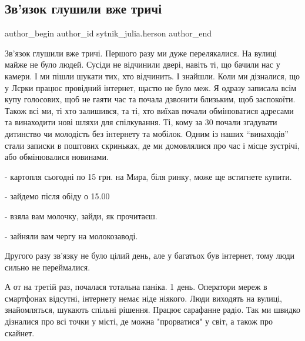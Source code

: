  
 
 
 
 
 
\subsection{Зв'язок глушили вже тричі}
\label{sec:04_05_2022.fb.sytnik_julia.herson.1.zvjazok_glyshili_trychi}
 
\ifcmt
 author_begin
   author_id sytnik_julia.herson
 author_end
\fi

Зв'язок глушили вже тричі. Першого разу ми дуже перелякалися. На вулиці майже
не було людей. Сусіди не відчинили двері, навіть ті, що бачили нас у камери. І
ми пішли шукати тих, хто відчинить. І знайшли. Коли ми дізналися, що у Лєрки
працює провідний інтернет, щастю не було меж. Я одразу записала всім купу
голосових, щоб не гаяти час та почала дзвонити близьким, щоб заспокоїти. Також
всі ми, ті хто залишився, та ті, хто виїхав почали обмінюватися адресами та
винаходити нові шляхи для спілкування. Ті, кому за 30 почали згадувати
дитинство чи молодість без інтернету та мобілок. Одним із наших \enquote{винаходів}
стали записки в поштових скриньках, де ми домовлялися про час і місце зустрічі,
або обмінювалися новинами.


- картопля сьогодні по 15 грн. на Мира, біля ринку, може ще встигнете купити.

- зайдемо після обіду о 15.00 

- взяла вам молочку, зайди, як прочитаєш. 

- зайняли вам чергу на молокозаводі.

Другого разу зв'язку не було цілий день, але у багатьох був інтернет, тому люди
сильно не переймалися. 

А от на третій раз, почалася тотальна паніка. 1 день. Оператори мереж в
смартфонах відсутні, інтернету немає ніде ніякого. Люди виходять на вулиці,
знайомляться, шукають спільні рішення. Працює сарафанне радіо. Так ми швидко
дізналися про всі точки у місті, де можна "прорватися" у світ, а також про
скайнет.

